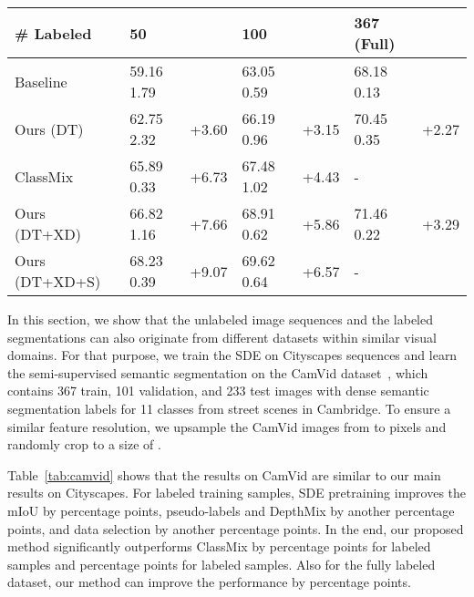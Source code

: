 \documentclass[final]{cvpr}
\newcommand*{\blarrow}{\rotatebox[origin=c]{270}{}}
\begin{document}
\begin{table*}
\caption{Performance on the CamVid test set (mIoU in \%, standard deviation over 3 random seeds). The SDE is trained on Cityscapes sequences. DT: SDE Transfer Learning, XD - DepthMix, S: Data Selection.}
\label{tab:camvid}
\vspace{0.2cm}
\centering
\setlength{\tabcolsep}{5pt}
\begin{tabular}{lllllll}
\hline
\# Labeled & 50    &        & 100     &       & 367 (Full) &       \\\hline\hline
Baseline & 59.16	\scriptsize{1.79} & \blarrow &		63.05	\scriptsize{0.59} & \blarrow &		68.18	\scriptsize{0.13} & \blarrow \\
Ours (DT) & 62.75	\scriptsize{2.32} &	+3.60 &	66.19	\scriptsize{0.96} &	+3.15 &	70.45	\scriptsize{0.35} &	+2.27 \\
ClassMix~\cite{olsson2020classmix} & 65.89	\scriptsize{0.33} &	+6.73 &	67.48	\scriptsize{1.02} &	+4.43 &	-	&  \\
Ours (DT+XD) & 66.82	\scriptsize{1.16} &	+7.66 &	68.91	\scriptsize{0.62} &	+5.86 &	71.46	\scriptsize{0.22} &	+3.29 \\
Ours (DT+XD+S) & 68.23	\scriptsize{0.39} &	+9.07 &	69.62	\scriptsize{0.64} &	+6.57 &	- & \\
\hline
\end{tabular}
\end{table*}

In this section, we show that the unlabeled image sequences and the labeled segmentations can also originate from different datasets within similar visual domains. For that purpose, we train the SDE on Cityscapes sequences and learn the semi-supervised semantic segmentation on the CamVid dataset~\cite{brostow2009semantic}, which contains 367 train, 101 validation, and 233 test images with dense semantic segmentation labels for 11 classes from street scenes in Cambridge. To ensure a similar feature resolution, we upsample the CamVid images from  to  pixels and randomly crop to a size of .

Table~\ref{tab:camvid} shows that the results on CamVid are similar to our main results on Cityscapes. For  labeled training samples, SDE pretraining improves the mIoU by  percentage points, pseudo-labels and DepthMix by another  percentage points, and data selection by another  percentage points. In the end, our proposed method significantly outperforms ClassMix by  percentage points for  labeled samples and  percentage points for  labeled samples. Also for the fully labeled dataset, our method can improve the performance by  percentage points.
\end{document}
